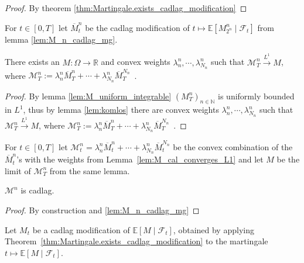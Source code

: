 \begin{proof}
By theorem \ref{thm:Martingale.exists_cadlag_modification}
\end{proof}


\begin{definition}\label{def:barM}
For $t\in[0,T]$ let $\overline{M}^n_t$ be the cadlag modification of $t \mapsto \mathbb{E}[M^n_{2^n} \mid \mathcal{F}_t]$ from lemma \ref{lem:M_n_cadlag_mg}.
\end{definition}


\begin{lemma}\label{lem:M_cal_converges_L1}
  There exists an $M : \Omega \to \mathbb{R}$ and convex weights $\lambda^n_n,\cdots,\lambda^n_{N_n}$ such that
  $\mathcal{M}^n_T\stackrel{L^1}{\rightarrow}M$, where $\mathcal{M}^n_T := \lambda^n_n \overline{M}^n_T+ \cdots + \lambda^n_{N_n} \overline{M}^{N_n}_T$~.
\end{lemma}

\begin{proof}
  By lemma \ref{lem:M_uniform_integrable} $(M^n_T)_{n\in\mathbb{N}}$ is uniformly bounded in $L^1$, thus by lemma \ref{lem:komlos} there are convex weights $\lambda^n_n,\cdots,\lambda^n_{N_n}$ such that
  $\mathcal{M}^n_T\stackrel{L^1}{\rightarrow}M$, where $\mathcal{M}^n_T := \lambda^n_n \overline{M}^n_T+ \cdots + \lambda^n_{N_n} \overline{M}^{N_n}_T$~.
\end{proof}


\begin{definition}\label{def:calM}
For $t\in[0,T]$ let $\mathcal{M}^n_t=\lambda^n_n \overline{M}^n_t+\cdots +\lambda^n_{N_n} \overline{M}^{N_n}_t$ be the convex combination of the $\overline{M}^n_t$'s with the weights from Lemma~\ref{lem:M_cal_converges_L1} and let $M$ be the limit of $\mathcal{M}^n_T$ from the same lemma.
\end{definition}


\begin{lemma}\label{lem:M_cal_cadlag}
  $\mathcal{M}^n$ is cadlag.
\end{lemma}

\begin{proof}
  By construction and \ref{lem:M_n_cadlag_mg}
\end{proof}


\begin{definition}\label{def:M}
Let $M_t$ be a cadlag modification of $\mathbb{E}[M \mid \mathcal{F}_t]$, obtained by applying Theorem~\ref{thm:Martingale.exists_cadlag_modification} to the martingale $t \mapsto \mathbb{E}[M \mid \mathcal{F}_t]$.
\end{definition}


